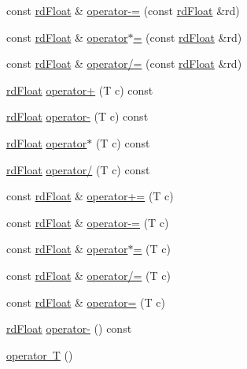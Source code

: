 \begin{DoxyCompactItemize}
const \mbox{\hyperlink{structrd_float}{rd\+Float}} \& \mbox{\hyperlink{structrd_float_a2d9f7dff81001e9ef2693b56e71f8d3b}{operator-\/=}} (const \mbox{\hyperlink{structrd_float}{rd\+Float}} \&rd)
\item 
const \mbox{\hyperlink{structrd_float}{rd\+Float}} \& \mbox{\hyperlink{structrd_float_a6157eded7f08502ffe4149f95f490eab}{operator$\ast$=}} (const \mbox{\hyperlink{structrd_float}{rd\+Float}} \&rd)
\item 
const \mbox{\hyperlink{structrd_float}{rd\+Float}} \& \mbox{\hyperlink{structrd_float_a008611556a5bb6d0b7c0b17ba4784f3c}{operator/=}} (const \mbox{\hyperlink{structrd_float}{rd\+Float}} \&rd)
\item 
\mbox{\hyperlink{structrd_float}{rd\+Float}} \mbox{\hyperlink{structrd_float_a4132e976df50fd87a522669462e4e074}{operator+}} (T c) const
\item 
\mbox{\hyperlink{structrd_float}{rd\+Float}} \mbox{\hyperlink{structrd_float_acbefb7030e7f4f743eb167c606850549}{operator-\/}} (T c) const
\item 
\mbox{\hyperlink{structrd_float}{rd\+Float}} \mbox{\hyperlink{structrd_float_a954150029323e6e561c63ba9ed6c7cb4}{operator$\ast$}} (T c) const
\item 
\mbox{\hyperlink{structrd_float}{rd\+Float}} \mbox{\hyperlink{structrd_float_a892799710d9ca5082cb8e32c40cd6e96}{operator/}} (T c) const
\item 
const \mbox{\hyperlink{structrd_float}{rd\+Float}} \& \mbox{\hyperlink{structrd_float_a6e2f17eb3a83a87c5d5fe1c0990ee669}{operator+=}} (T c)
\item 
const \mbox{\hyperlink{structrd_float}{rd\+Float}} \& \mbox{\hyperlink{structrd_float_ad085dbc356e048b977005f70b7049f11}{operator-\/=}} (T c)
\item 
const \mbox{\hyperlink{structrd_float}{rd\+Float}} \& \mbox{\hyperlink{structrd_float_ac7625885a4da5b916ae40e6aea38c3c1}{operator$\ast$=}} (T c)
\item 
const \mbox{\hyperlink{structrd_float}{rd\+Float}} \& \mbox{\hyperlink{structrd_float_a521e7d92acc8fe8abf9192e8217db832}{operator/=}} (T c)
\item 
const \mbox{\hyperlink{structrd_float}{rd\+Float}} \& \mbox{\hyperlink{structrd_float_aa34e2b3f4be15b438dd5e7de7672bc3a}{operator=}} (T c)
\item 
\mbox{\hyperlink{structrd_float}{rd\+Float}} \mbox{\hyperlink{structrd_float_ae14557d9cdc0da5973748908c177b458}{operator-\/}} () const
\item 
\mbox{\hyperlink{structrd_float_ad2a2c765e3803530d915cab1fc9de149}{operator T}} ()
\end{DoxyCompactItemize}

